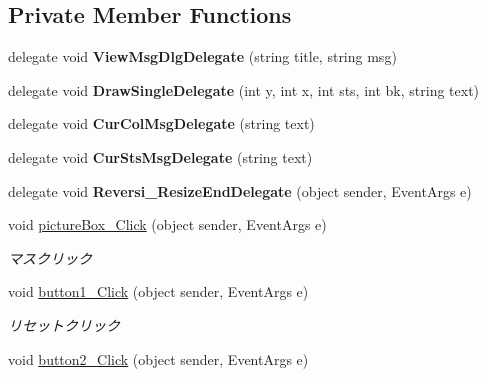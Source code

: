 \subsection*{Private Member Functions}
\begin{DoxyCompactItemize}
\item 
\mbox{\label{class_reversi4color_form_1_1_reversi_aa83ab1c0d7ce3e62ff0a7621f828c605}} 
delegate void {\bfseries View\+Msg\+Dlg\+Delegate} (string title, string msg)
\item 
\mbox{\label{class_reversi4color_form_1_1_reversi_ad81ae0deeca8d7b1f8946f54e5af7602}} 
delegate void {\bfseries Draw\+Single\+Delegate} (int y, int x, int sts, int bk, string text)
\item 
\mbox{\label{class_reversi4color_form_1_1_reversi_aa4d911dab2f8eb28788a16a50f2c16b7}} 
delegate void {\bfseries Cur\+Col\+Msg\+Delegate} (string text)
\item 
\mbox{\label{class_reversi4color_form_1_1_reversi_ae7e6cf23f7b9ecc3b127cb0a4c6f1b11}} 
delegate void {\bfseries Cur\+Sts\+Msg\+Delegate} (string text)
\item 
\mbox{\label{class_reversi4color_form_1_1_reversi_adc77f11d95e862ea51cb3c7a3a816f99}} 
delegate void {\bfseries Reversi\+\_\+\+Resize\+End\+Delegate} (object sender, Event\+Args e)
\item 
void \hyperlink{class_reversi4color_form_1_1_reversi_af0467d1e6e97eab2d7f6f12384129135}{picture\+Box\+\_\+\+Click} (object sender, Event\+Args e)
\begin{DoxyCompactList}\small\item\em マスクリック \end{DoxyCompactList}\item 
void \hyperlink{class_reversi4color_form_1_1_reversi_a6c7543d2823cf116c55bba3b970e4931}{button1\+\_\+\+Click} (object sender, Event\+Args e)
\begin{DoxyCompactList}\small\item\em リセットクリック \end{DoxyCompactList}\item 
void \hyperlink{class_reversi4color_form_1_1_reversi_a99a5abaa127633df40da37167d579541}{button2\+\_\+\+Click} (object sender, Event\+Args e)

\end{DoxyCompactItemize}
